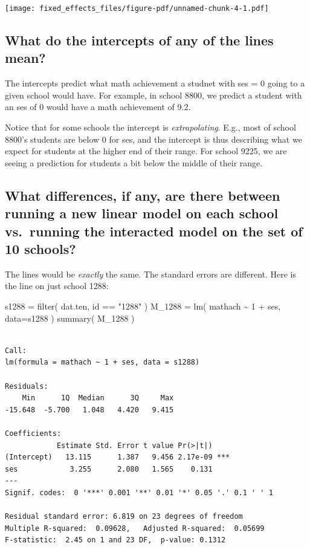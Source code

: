 \documentclass[
  letterpaper,
  DIV=11,
  numbers=noendperiod]{scrreprt}
\newenvironment{Shaded}{}{}
\newcommand{\AttributeTok}[1]{\textcolor[rgb]{0.49,0.56,0.16}{#1}}
\newcommand{\DecValTok}[1]{\textcolor[rgb]{0.25,0.63,0.44}{#1}}
\newcommand{\FunctionTok}[1]{\textcolor[rgb]{0.02,0.16,0.49}{#1}}
\newcommand{\NormalTok}[1]{#1}
\newcommand{\OtherTok}[1]{\textcolor[rgb]{0.00,0.44,0.13}{#1}}
\newcommand{\SpecialCharTok}[1]{\textcolor[rgb]{0.25,0.44,0.63}{#1}}
\newcommand{\StringTok}[1]{\textcolor[rgb]{0.25,0.44,0.63}{#1}}
\begin{document}
\texttt{[image: fixed\_effects\_files/figure-pdf/unnamed-chunk-4-1.pdf]}

\subsection{What do the intercepts of any of the lines
mean?}\label{what-do-the-intercepts-of-any-of-the-lines-mean}

The intercepts predict what math achievement a studnet with ses = 0
going to a given school would have. For example, in school 8800, we
predict a student with an ses of 0 would have a math achievement of 9.2.

Notice that for some schools the intercept is \emph{extrapolating}.
E.g., most of school 8800's students are below 0 for ses, and the
intercept is thus describing what we expect for students at the higher
end of their range. For school 9225, we are seeing a prediction for
students a bit below the middle of their range.

\subsection{What differences, if any, are there between running a new
linear model on each school vs.~running the interacted model on the set
of 10
schools?}\label{what-differences-if-any-are-there-between-running-a-new-linear-model-on-each-school-vs.-running-the-interacted-model-on-the-set-of-10-schools}

The lines would be \emph{exactly} the same. The standard errors are
different. Here is the line on just school 1288:

\begin{Shaded}
\begin{Highlighting}[]
\NormalTok{s1288 }\OtherTok{=} \FunctionTok{filter}\NormalTok{( dat.ten, id }\SpecialCharTok{==} \StringTok{"1288"}\NormalTok{ )}
\NormalTok{M\_1288 }\OtherTok{=} \FunctionTok{lm}\NormalTok{( mathach }\SpecialCharTok{\textasciitilde{}} \DecValTok{1} \SpecialCharTok{+}\NormalTok{ ses, }\AttributeTok{data=}\NormalTok{s1288 )}
\FunctionTok{summary}\NormalTok{( M\_1288 )}
\end{Highlighting}
\end{Shaded}

\begin{verbatim}

Call:
lm(formula = mathach ~ 1 + ses, data = s1288)

Residuals:
    Min      1Q  Median      3Q     Max 
-15.648  -5.700   1.048   4.420   9.415 

Coefficients:
            Estimate Std. Error t value Pr(>|t|)    
(Intercept)   13.115      1.387   9.456 2.17e-09 ***
ses            3.255      2.080   1.565    0.131    
---
Signif. codes:  0 '***' 0.001 '**' 0.01 '*' 0.05 '.' 0.1 ' ' 1

Residual standard error: 6.819 on 23 degrees of freedom
Multiple R-squared:  0.09628,   Adjusted R-squared:  0.05699 
F-statistic:  2.45 on 1 and 23 DF,  p-value: 0.1312
\end{verbatim}
\end{document}
